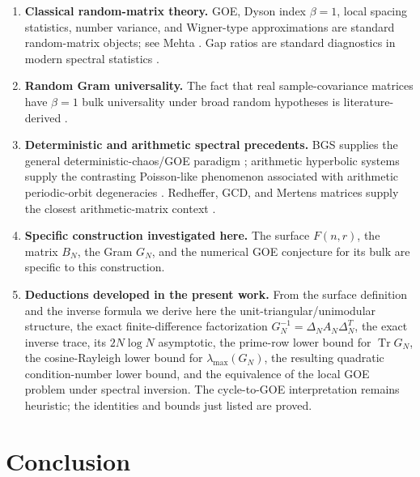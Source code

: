 \documentclass[11pt]{amsart}
\numberwithin{equation}{section}
\theoremstyle{plain}
\theoremstyle{definition}
\theoremstyle{remark}
\newcommand{\Tr}{\operatorname{Tr}}
\begin{document}
\begin{enumerate}[label=(\roman*)]
\item \textbf{Classical random-matrix theory.}  GOE, Dyson index $\beta=1$, local spacing statistics, number variance, and Wigner-type approximations are standard random-matrix objects; see Mehta \cite{Mehta2004}.  Gap ratios are standard diagnostics in modern spectral statistics \cite{OganesyanHuse2007,Atas2013}.

\item \textbf{Random Gram universality.}  The fact that real sample-covariance matrices have $\beta=1$ bulk universality under broad random hypotheses is literature-derived \cite{TaoVu2012,PillaiYin2014}.

\item \textbf{Deterministic and arithmetic spectral precedents.}  BGS supplies the general deterministic-chaos/GOE paradigm \cite{BGS1984}; arithmetic hyperbolic systems supply the contrasting Poisson-like phenomenon associated with arithmetic periodic-orbit degeneracies \cite{BogomolnyEtAl1992,LuoSarnak1994}.  Redheffer, GCD, and Mertens matrices supply the closest arithmetic-matrix context \cite{BarrettJarvis1992,HongLoewy2004,Cardinal2010,ClementSteinerberger2025,Kline2019,Kline2020}.

\item \textbf{Specific construction investigated here.}  The surface $F(n,r)$, the matrix $B_N$, the Gram $G_N$, and the numerical GOE conjecture for its bulk are specific to this construction.

\item \textbf{Deductions developed in the present work.}  From the surface definition and the inverse formula we derive here the unit-triangular/unimodular structure, the exact finite-difference factorization $G_N^{-1}=\Delta_NA_N\Delta_N^T$, the exact inverse trace, its $2N\log N$ asymptotic, the prime-row lower bound for $\Tr G_N$, the cosine-Rayleigh lower bound for $\lambda_{\max}(G_N)$, the resulting quadratic condition-number lower bound, and the equivalence of the local GOE problem under spectral inversion.  The cycle-to-GOE interpretation remains heuristic; the identities and bounds just listed are proved.
\end{enumerate}

\section{Conclusion}
\label{sec:conclusion}
\end{document}
